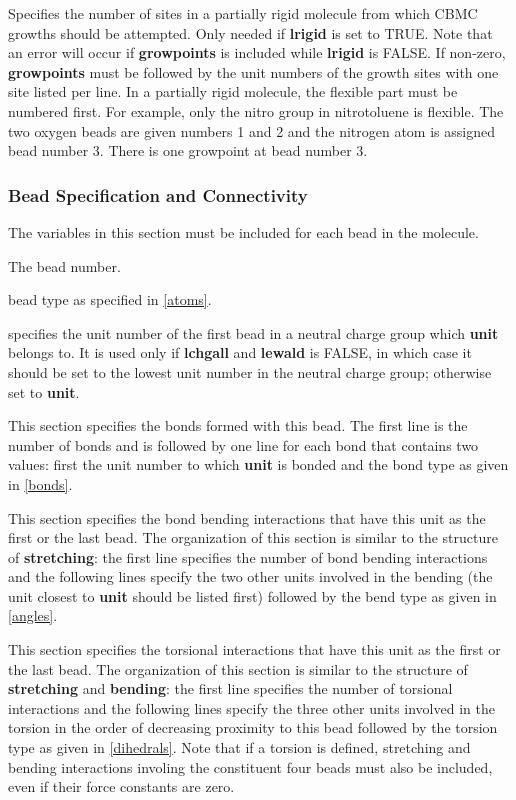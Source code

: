 \documentclass[12pt,letterpaper]{article}
\begin{document}
 Specifies the number of sites in
a partially rigid molecule from which CBMC growths should be
attempted. Only needed if {\bf lrigid} is set to TRUE. Note
that an error will occur if {\bf growpoints} is included
while {\bf lrigid} is FALSE. If non-zero, {\bf growpoints}
must be followed by the unit numbers of the growth sites
with one site listed per line. In a partially rigid
molecule, the flexible part must be numbered first. For
example, only the nitro group in nitrotoluene is flexible.
The two oxygen beads are given numbers 1 and 2 and the
nitrogen atom is assigned bead number 3. There is one
growpoint at bead number 3.

\subsubsection{Bead Specification and Connectivity}
\label{beadspec}
The variables in this section must be included for each bead
in the molecule.

 The bead number.

 bead type as specified in \ref{atoms}.

 specifies the unit number of the
first bead in a neutral charge group which {\bf unit}
belongs to. It is used only if {\bf lchgall} and {\bf
  lewald} is FALSE, in which case it should be set to the
lowest unit number in the neutral charge group; otherwise
set to {\bf unit}.

 This section specifies the bonds
formed with this bead. The first line is the number of bonds
and is followed by one line for each bond that contains two
values: first the unit number to which {\bf unit} is bonded
and the bond type as given in \ref{bonds}.

 This section specifies the bond
bending interactions that have this unit as the first or the
last bead. The organization of this section is similar to
the structure of {\bf stretching}: the first line specifies
the number of bond bending interactions and the following
lines specify the two other units involved in the bending
(the unit closest to {\bf unit} should be listed first)
followed by the bend type as given in \ref{angles}.

 This section specifies the torsional
interactions that have this unit as the first or the last
bead. The organization of this section is similar to the
structure of {\bf stretching} and {\bf bending}: the first
line specifies the number of torsional interactions and the
following lines specify the three other units involved in
the torsion in the order of decreasing proximity to this
bead followed by the torsion type as given in
\ref{dihedrals}. Note that if a torsion is defined,
stretching and bending interactions involing the constituent
four beads must also be included, even if their force
constants are zero.
\end{document}
